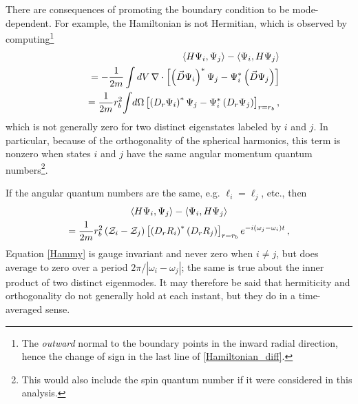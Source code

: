 \documentclass[pra,twocolumn,nofootinbib, superscriptaddress]{revtex4}%
\def\({\left(}
\def\){\right)}
\def\[{\left[}
\def\]{\right]}
\def\f#1#2{\frac{#1}{#2}}
\def\del{\nabla}
\def\o{\omega}
\def\<{\langle}
\def\>{\rangle}
\providecommand{\abs}[1]{\left\lvert#1\right\rvert}
\begin{document}
There are consequences of promoting the boundary condition to be mode-dependent. For example, the Hamiltonian is not Hermitian, which is observed by computing\footnote{The \emph{outward} normal to the boundary points in the inward radial direction, hence the change of sign in the last line of \eqref{Hamiltonian_diff}.}
\begin{eqnarray}\label{Hamiltonian_diff}
&&\<H\Psi_i,\Psi_j\> - \<\Psi_i,H\Psi_j\>\notag\\
&&=-\f{1}{2m}   \int dV\,\del\cdot \[\(\vec{D}\Psi_i\)^* \Psi_j - \Psi_i^*\(\vec{D}\Psi_j\)  \]\notag\\
&&=\f{1}{2m}r_b^2 \!  \int \!d\Omega  \[\(D_r\Psi_i\)^* \Psi_j - \Psi_i^*\(D_r\Psi_j\)  \]_{r=r_b},
\end{eqnarray}
which is not generally zero for two distinct eigenstates labeled by $i$ and $j$. In particular, because of the orthogonality of the spherical harmonics, this term is nonzero when states $i$ and $j$ have the same angular momentum quantum numbers\footnote{This would also include the spin quantum number if it were considered in this analysis.}.

If the angular quantum numbers are the same, e.g. $\ell_i=\ell_j$, etc., then
\begin{multline}\label{Hammy}
\<H\Psi_i,\Psi_j\> - \<\Psi_i,H\Psi_j\> \\
= \f{1}{2m}r_b^2 \({\cal Z}_i-{\cal Z}_j\)   \[\(D_rR_i\)^*\(D_rR_j\)  \]_{r=r_b} e^{-i\(\o_j-\o_i\)t}\,,
\end{multline}
 Equation \eqref{Hammy} is gauge invariant and never zero when $i\neq j$, but does average to zero over a period $2\pi/\abs{\o_i-\o_j}$; the same is true about the inner product of two distinct eigenmodes.  It may therefore be said that hermiticity and orthogonality do not generally hold at each instant, but they do in a time-averaged sense.
 
\end{document}
